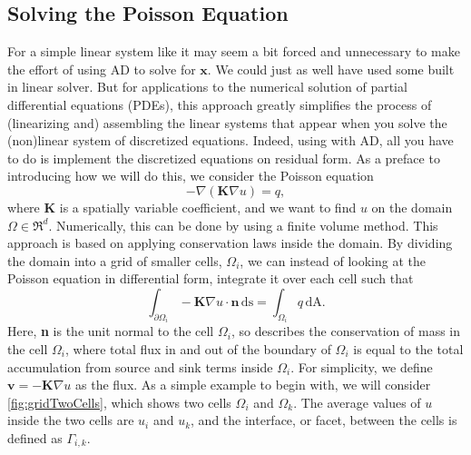 \subsection{Solving the Poisson Equation}
\label{sec:poissonEq}
For a simple linear system like  it may seem a bit forced and unnecessary to make the effort of using AD to solve for $\boldsymbol{x}$. We could just as well have used some built in linear solver. But for applications to the numerical solution of partial differential equations (PDEs), this approach greatly simplifies the process of (linearizing and) assembling the linear systems that appear when you solve the (non)linear system of discretized equations. Indeed, using  with AD, all you have to do is implement the discretized equations on residual form.  As a preface to introducing how we will do this, we consider the Poisson equation
\begin{equation}
    -\nabla(\textbf{K}\nabla u) = q,
    \label{eq:Poisson}
\end{equation}
where \textbf{K} is a spatially variable coefficient, and we want to find $u$ on the domain $\Omega \in \Re^d$. Numerically, this can be done by using a finite volume method. This approach is based on applying conservation laws inside the domain. By dividing the domain into a grid of smaller cells, $\Omega_i$, we can instead of looking at the Poisson equation in differential form, integrate it over each cell such that
\begin{equation}
    \int_{\partial\Omega_i}\!\!- \textbf{K} \nabla u \cdot \textbf{n}\, \mbox{ds} = \int_{\Omega_i} q \,\mbox{dA}.
    \label{eq:conservation}
\end{equation}
Here, \textbf{n} is the unit normal to the cell $\Omega_i$, so  describes the conservation of mass in the cell $\Omega_i$, where total flux in and out of the boundary of $\Omega_i$ is equal to the total accumulation from source and sink terms inside $\Omega_i$. For simplicity, we define $\textbf{v} = - \textbf{K} \nabla u$ as the flux. As a simple example to begin with, we will consider \autoref{fig:gridTwoCells}, which shows two cells $\Omega_i$ and $\Omega_k$. The average values of $u$ inside the two cells are $u_i$ and $u_k$, and the interface, or facet, between the cells is defined as $\Gamma_{i,k}$.
